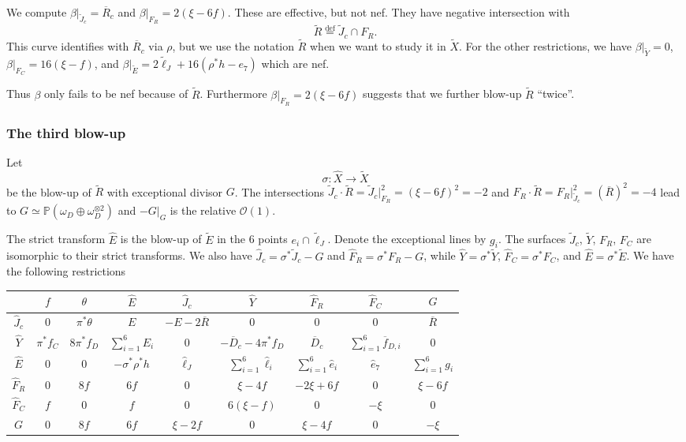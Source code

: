 \documentclass[12pt]{amsart}
\theoremstyle{definition}
\newcommand{\bb}{\ensuremath{\mathfrak{b}}}
\newcommand{\deq}{\ensuremath{\stackrel{\textrm{def}}{=}}}
\newcommand{\?}{ \circled{{\large\bf ?}}}
\let\cal\mathcal
\let\bb\mathbb
\begin{document}
	We compute $\beta|_{\widetilde J_c}=\overline R_c$ and $\beta|_{F_R}=2(\xi-6f)$. These are effective, but not nef. They have negative intersection with \[\widetilde R\deq \widetilde J_c\cap F_R.\]
	This curve identifies with $\overline R_c$ via $\rho$, but we use the notation $\widetilde R$ when we want to study it in $\widetilde X$. 
	For the other restrictions, we have $\beta|_{\widetilde Y}=0$, $\beta|_{F_C}=16(\xi-f)$, and $\beta|_{\widetilde E}=2 \widetilde{\ell}_J+16(\rho^*h-e_7)$ which are nef. 
	
	Thus $\beta$ only fails to be nef because of $\widetilde R$. Furthermore $\beta|_{F_R}=2(\xi-6f)$ suggests that we further blow-up $\widetilde R$ ``twice''. 

\subsubsection{The third blow-up} Let 
\[\sigma:\widehat X\to\widetilde X\] be the blow-up of $\widetilde R$ with exceptional divisor $G$. The intersections $\widetilde J_c\cdot\widetilde R=\widetilde J_c|_{F_R}^2=(\xi-6f)^2=-2$ and $F_R\cdot\widetilde R=F_R|_{\widetilde J_c}^2=(\overline R)^2=-4$ lead to $G\simeq \bb P(\omega_D\oplus\omega_D^{\otimes 2})$ and $-G|_G$ is the relative $\cal O(1)$. 

The strict transform $\widehat E$ is the blow-up of $\widetilde E$ in the 6 points $e_i\cap\widetilde{\ell}_J$. Denote the exceptional lines by $g_i$. The surfaces $\widetilde J_c$, $\widetilde Y$, $F_R$, $F_C$ are isomorphic to their strict transforms. We also have $\widehat J_c=\sigma^*\widetilde J_c-G$ and $\widehat F_R=\sigma^*F_R-G$, while $\widehat Y=\sigma^*\widetilde Y$, $\widehat F_C=\sigma^*F_C$, and $\widehat E=\sigma^*\widetilde E$.
We have the following restrictions

\begin{center}
	\begin{tabular}{|c|c|c|c|c|c|c|c|c|}
		\hline 
		& $f$& $\theta$& $\widehat E$& $\widehat J_c$ & $\widehat Y$ & $\widehat F_R$& $\widehat F_C$& $G$\\
		\hline\hline 
		$\widehat J_c$ & $0$ & $\pi^*\theta$  & $E$ & $-E-2\overline R$ & $0$ & $0$ & $0$ & $\overline R$ \\
		\hline 
		$\widehat Y$ & $\pi^*f_C$ & $8\pi^*f_D$ & $\sum_{i=1}^6E_i$ & $0$ & $-\overline D_c-4\pi^*f_D$ & $\overline D_c$ & $\sum_{i=1}^6\overline f_{D,i}$ & $0$ \\
		\hline 
		$\widehat E$ & $0$ & $0$ & $-\sigma^*\rho^*h$ & $\widehat{\ell}_J$ & $\sum_{i=1}^6\widehat{\ell}_i$ & $\sum_{i=1}^6\widehat e_i$ & $\widehat e_7$ & $\sum_{i=1}^6g_i$ \\
		\hline 
		$\widehat F_R$ & $0$  & $8f$ & $6f$ & $0$ & $\xi-4f$ & $-2\xi+6f$ & $0$ & $\xi-6f$\\ 
		\hline 
		$\widehat F_C$ & $f$ & $0$ & $f$ & $0$ & $6(\xi-f)$ & $0$ & $-\xi$ & $0$	\\
		\hline 	 
		$G$ & $0$ & $8f$ & $6f$ & $\xi-2f$ & $0$ & $\xi-4f$ & $0$ & $-\xi$\\
		\hline 
	\end{tabular}
\end{center}
\end{document}
